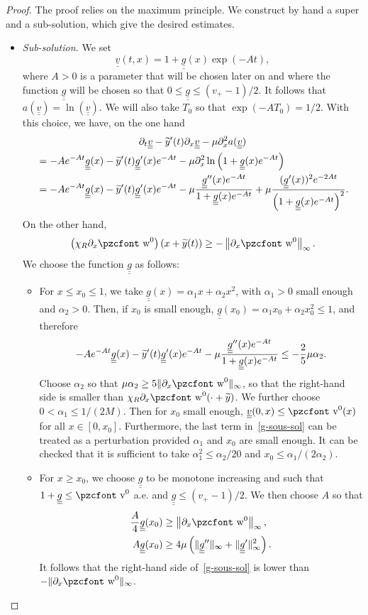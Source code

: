 \documentclass[10pt]{amsart}
\theoremstyle{definition}\newtheorem{defi}[theo]{Definition}\newtheorem{rema}[theo]{Remark}\newtheorem{exam}[theo]{Example}\newtheorem{exem}[theo]{Example}\newtheorem{nota}[theo]{Notation}
\newcommand{\mathpzc}[1]{\text{\pzcfont #1}}
\newcommand{\p}{\partial}
\newcommand{\tv}{\mathpzc{v}}
\newcommand{\tw}{\mathpzc{w}}
\newcommand{\ty}{\widetilde{y}}
\newcommand{\uuv}{\underline{\underline{v}}}
\newcommand{\ug}{\underline{\underline{g}}}
\let\oldtilde\tilde
\renewcommand*{\tilde}[1]{\mathchoice{\widetilde{#1}}{\widetilde{#1}}{\oldtilde{#1}}{\oldtilde{#1}}}
\begin{document}
\begin{proof}
The proof relies on the maximum principle. We construct by hand a super and a sub-solution, which give the desired estimates.
\begin{itemize}
\item \emph{Sub-solution.} We set
\[
\uuv(t,x) = 1 + \ug(x) \exp(-A t),
\]
where $A>0$ is a parameter that will be chosen later on and where the function $\ug$ will be chosen so that $0\leq \ug \leq (v_+-1)/2$. It follows that $a(\uuv)=\ln (\uuv)$. We will also take $T_0$ so that $\exp(-A T_0)=1/2$. With this choice, we have, on the one hand
\begin{multline}\label{g-sous-sol}
\partial_t \uuv - \ty'(t)\partial_x \uuv - \mu \partial^2_x a (\uuv)\\
\begin{aligned}
&=- A e^{-At} \ug(x) - \tilde y'(t) \ug'(x) e^{-At} - \mu \p_x^2 \ln \left(1+ \ug(x) e^{-At}\right)\\
&=- A e^{-At} \ug(x) - \tilde y'(t) \ug'(x) e^{-At} -\mu\frac{\ug''(x) e^{-At}}{1+ \ug(x)e^{-At} } +\mu \frac{(\ug'(x))^2 e^{-2At}}{\left(1+ \ug(x)e^{-At}\right)^2}.
\end{aligned} 
\end{multline}
On the other hand,
\[
\left(\chi_R \p_x \tw^0\right)(x+ \ty(t)) \geq -\left\|\p_x \tw^0\right\|_\infty.
\]
We choose the function $\ug$ as follows:
\begin{itemize}
\item For $x\leq x_0\leq 1$, we take $\ug(x)= \alpha_1 x + \alpha_2 x^2$, with $\alpha_1>0$ small enough and $\alpha_2>0$. Then, if $x_0$ is small enough, $\ug(x_0) = \alpha_1 x_0 + \alpha_2 x_0^2 \leq 1$, and therefore
\[
- A e^{-At} \ug(x) - \tilde y'(t) \ug'(x) e^{-At} - \mu\frac{\ug''(x) e^{-At}}{1 + \ug(x)e^{-At} }
\leq -\frac{2}{5}{\mu \alpha_2}.
\]
Choose $\alpha_2$ so that $\mu \alpha_2\geq 5 \|\p_x \tw^0\|_\infty$, so that the right-hand side is smaller than $\chi_R \p_x \tw^0(\cdot + \ty)$. We further choose $0<\alpha_1\leq 1/(2M)$. Then for $x_0$ small enough, $\uuv(0,x)\leq \tv^0(x)$ for all $x\in [0,x_0]$. Furthermore, the last term in~\eqref{g-sous-sol} can be treated as a perturbation provided $\alpha_1$ and $x_0 $ are small enough. It can be checked that it is sufficient to take $\alpha_1^2\leq \alpha_2/{20}$ and $x_0\leq \alpha_1/(2\alpha_2)$.

\item For $x\geq x_0$, we choose $\ug$ to be monotone increasing and such that $1 + \ug \leq \tv^0$ a.e. and $\ug \leq (v_+-1)/2$. We then choose $A$ so that
\begin{align*}
\frac{A}{4} \ug(x_0) &\geq \left\|\p_x \tw^0\right\|_\infty,\\
A \ug(x_0)&\geq 4\mu \left(\|\ug''\|_\infty + \|\ug'\|_\infty^2\right).
\end{align*}
It follows that the right-hand side of~\eqref{g-sous-sol} is lower than $-\|\p_x \tw^0\|_\infty$.
\end{itemize}


\end{itemize}
\end{proof}
\end{document}
